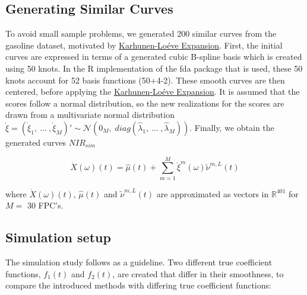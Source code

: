 \documentclass[11pt,twoside,a4paper]{article}
\begin{document}
		
	
	\subsection{Generating Similar Curves}
	To avoid small sample problems, we generated 200 similar curves from the gasoline dataset, motivated by \hyperlink{KL}{Karhunen-Lo\'{e}ve Expansion}. First, the initial curves are expressed in terms of a generated cubic B-spline basis which is created using 50 knots. In the R implementation of the fda package that is used, these 50 knots account for 52 basis functions (50+4-2). These smooth curves are then centered, before applying the \hyperlink{KL}{Karhunen-Lo\'{e}ve Expansion}. It is assumed that the scores follow a normal distribution, so the new realizations for the scores are drawn from a multivariate normal distribution $\mathring{\xi} = \left(\mathring{\xi}_{1},\: \dots \:, \mathring{\xi}_{M}\right)' \sim \mathcal{N}(0_M, \; diag(\hat{\lambda}_1,\: \dots\:, \hat{\lambda}_M))$. Finally, we obtain the generated curves $NIR_{sim}$
	
	
	\begin{equation}
		\mathring{X}(\omega)(t) = \hat{\mu}(t) + \sum_{m = 1}^{M} \mathring{\xi}^m(\omega) \tilde{\nu}^{m,L}(t)
	\end{equation}
	
	where $\mathring{X}(\omega)(t)$, $\hat{\mu}(t)$ and $\tilde{\nu}^{m,L}(t)$  are approximated as vectors in $\mathbb{R}^{401}$ for $M =$ 30 FPC's.
    
    \subsection{Simulation setup}
	The simulation study follows \cite{Reiss_2007b} as a guideline. Two different true coefficient functions,  $f_1(t)$ and  $f_2(t)$, are created that differ in their smoothness, to compare the introduced methods with differing true coefficient functions:
	
\end{document}
